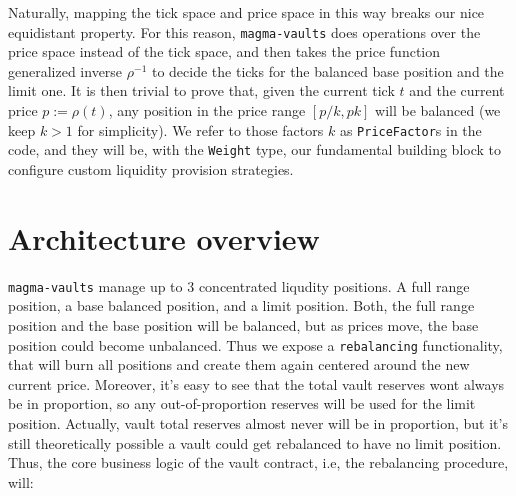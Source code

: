 \documentclass[11pt]{article}
\begin{document}
Naturally, mapping the tick space and price space in this way breaks our nice
equidistant property. For this reason, \texttt{magma-vaults} does operations over
the price space instead of the tick space, and then takes the price function
generalized inverse $\rho^{-1}$ to decide the ticks for the balanced base position and the
limit one. It is then trivial to prove that, given the current tick $t$ and the
current price $p := \rho(t)$, any position in the price range $[p/k, pk]$ will
be balanced (we keep $k > 1$ for simplicity). We refer to those factors $k$ as
\texttt{PriceFactor}s in the code, and they will be, with the
\texttt{Weight} type, our fundamental building block to configure custom
liquidity provision strategies.

\section{Architecture overview}
\texttt{magma-vaults} manage up to 3 concentrated liqudity positions. A full range
position, a base balanced position, and a limit position. Both, the full range
position and the base position will be balanced, but as prices move, the base
position could become unbalanced. Thus we expose a \texttt{rebalancing}
functionality, that will burn all positions and create them again centered
around the new current price. Moreover, it's easy to see that the total vault reserves
wont always be in proportion, so any out-of-proportion reserves will be used
for the limit position. Actually, vault total reserves almost never will be in
proportion, but it's still theoretically possible a vault could get rebalanced
to have no limit position. Thus, the core business logic of the vault contract,
i.e, the rebalancing procedure, will:
\end{document}
